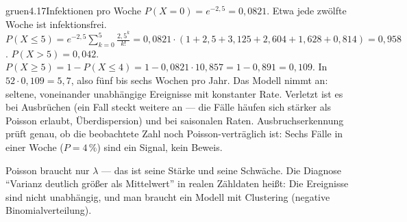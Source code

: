 \begin{loesungkarte}{gruen}{4.17}{Infektionen pro Woche}
$P(X = 0) = e^{-2{,}5} = 0{,}0821$. Etwa jede zwölfte Woche ist infektionsfrei.
$P(X\le5) = e^{-2{,}5}\sum_{k=0}^{5}\frac{2{,}5^{k}}{k!} = 0{,}0821\cdot(1 + 2{,}5 + 3{,}125 + 2{,}604 + 1{,}628 + 0{,}814) = 0{,}958$. $P(X > 5) = 0{,}042$.
$P(X\ge5) = 1 - P(X\le4) = 1 - 0{,}0821\cdot10{,}857 = 1 - 0{,}891 = 0{,}109$. In $52\cdot0{,}109 = 5{,}7$, also fünf bis sechs Wochen pro Jahr.
Das Modell nimmt an: seltene, voneinander unabhängige Ereignisse mit konstanter Rate. Verletzt ist es bei Ausbrüchen (ein Fall steckt weitere an --- die Fälle häufen sich stärker als Poisson erlaubt, Überdispersion) und bei saisonalen Raten. Ausbruchserkennung prüft genau, ob die beobachtete Zahl noch Poisson-verträglich ist: Sechs Fälle in einer Woche ($P = 4\,\%$) sind ein Signal, kein Beweis.
\begin{mitnehmen}\kastentext
Poisson braucht nur $\lambda$ --- das ist seine Stärke und seine Schwäche. Die Diagnose \enquote{Varianz deutlich größer als Mittelwert} in realen Zähldaten heißt: Die Ereignisse sind nicht unabhängig, und man braucht ein Modell mit Clustering (negative Binomialverteilung).
\end{mitnehmen}
\end{loesungkarte}

